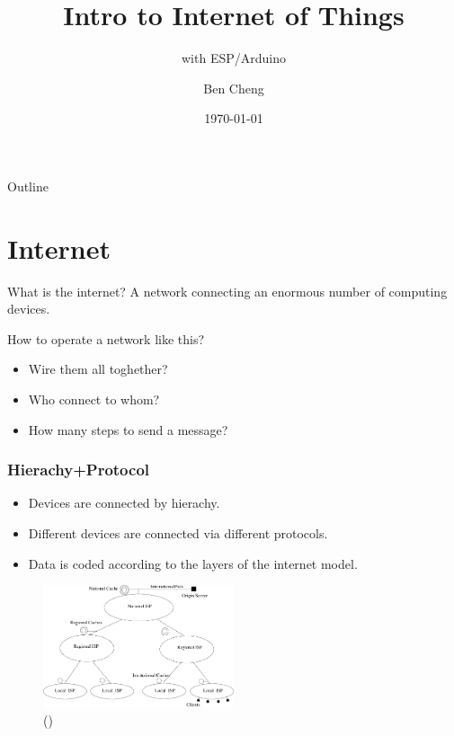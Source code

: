 \documentclass[compress, aspectratio=32]{beamer}
\title[IoT Intro]{Intro to Internet of Things}
\subtitle{with ESP/Arduino}
\author{Ben Cheng}
\institute{RISD ID}
\date{\today}
\begin{document}
\frame{\titlepage}

\begin{frame}[allowframebreaks]{Outline}
    \tableofcontents
\end{frame}

\section{Internet}
\begin{frame}{What is the internet?}
    A network connecting an enormous number of computing devices.
    \par How to operate a network like this?
    \begin{itemize}
        \item Wire them all toghether?
        \item Who connect to whom?
        \item How many steps to send a message?
    \end{itemize}
\end{frame}

\begin{frame}
    \frametitle{Hierachy+Protocol}
    \begin{itemize}
        \item Devices are connected by hierachy.
        \item Different devices are connected via different protocols.
        \item Data is coded according to the layers of the internet model.
    \end{itemize}
    \begin{figure}
        \includegraphics[width=0.5\textwidth]{Internet-topology-hierarchical-structure.png}
        \caption*{(\cite{inproceedings})}
    \end{figure}
\end{frame}
\end{document}
